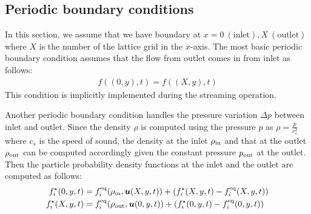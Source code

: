 \subsection{Periodic boundary conditions}
In this section, we assume that we have
boundary at $x = 0~(\text{inlet}), X~(\text{outlet})$
where $X$ is the number of the lattice grid in the $x$-axis.
The most basic periodic boundary condition assumes that
the flow from outlet comes in from inlet as follows: 
\begin{equation}
\begin{aligned}
  f((0, y), t) = f((X, y), t)
\end{aligned}
\end{equation}
This condition is implicitly implemented during the streaming operation.

Another periodic boundary condition handles
the pressure variation $\Delta p$ between inlet and outlet.
Since the density $\rho$ is computed using the pressure $p$
as $\rho = \frac{p}{c_s^2}$ where $c_s$ is the speed of sound,
the density at the inlet $\rho_{\rm in}$ and
that at the outlet $\rho_{\rm out}$ can be computed
accordingly given the constant pressure $p_{\rm out}$
at the outlet.
Then the particle probability density functions at 
the inlet and the outlet are computed as follows\cite{}:
\begin{equation}
\begin{aligned}
  f_i^\star(0, y, t) &=
  f_i^{\rm eq}(\rho_{\rm in}, \boldsymbol{u}(X, y, t))
  + (f_i^\star(X, y, t) - f_i^{\rm eq}(X, y, t))\\
  f_i^\star(X, y, t) &=
  f_i^{\rm eq}(\rho_{\rm out}, \boldsymbol{u}(0, y, t))
  + (f_i^\star(0, y, t) - f_i^{\rm eq}(0, y, t))\\
\end{aligned}
\end{equation}

